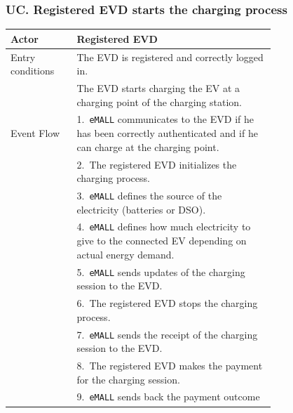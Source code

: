 \subsubsection*{UC\cuc . Registered EVD starts the charging process}
\begin{center}
    \begin{longtable}{lp{0.75\linewidth}}
        \hline
        Actor            & Registered EVD                                                                                                              \\
        \hline
        Entry conditions & The EVD is registered and correctly logged in.                                                                              \\
        & The EVD starts charging the EV at a charging point of the charging station.                                                 \\
        \hline
        Event Flow       & 1.\ \verb|eMALL| communicates to the EVD if he has been correctly authenticated and if he can charge at the charging point. \\
        & 2.\ The registered EVD initializes the charging process.                                                                    \\
        & 3.\ \verb|eMALL| defines the source of the electricity (batteries or DSO).                                                  \\
        & 4.\ \verb|eMALL| defines how much electricity to give to the connected EV depending on actual energy demand.                \\
        & 5.\ \verb|eMALL| sends updates of the charging session to the EVD.                                                          \\
        & 6.\ The registered EVD stops the charging process.                                                                          \\
        & 7.\ \verb|eMALL| sends the receipt of the charging session to the EVD.                                                      \\
        & 8.\ The registered EVD makes the payment for the charging session.                                                          \\
        & 9.\ \verb|eMALL| sends back the payment outcome                                                                             \\
        \hline

\end{longtable}
\end{center}

